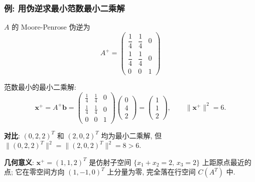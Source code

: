 \begin{frame}
\frametitle{例: 用伪逆求最小范数最小二乘解}

$A$ 的 Moore-Penrose 伪逆为
\[A^+ = \begin{pmatrix}\dfrac{1}{4} & \dfrac{1}{4} & 0 \\[6pt] \dfrac{1}{4} & \dfrac{1}{4} & 0 \\[2pt] 0 & 0 & 1\end{pmatrix}\]

\pause
\vspace{0.3em}

范数最小的最小二乘解:
\[\mathbf{x}^+ = A^+\mathbf{b} = \begin{pmatrix}\frac{1}{4}&\frac{1}{4}&0\\\frac{1}{4}&\frac{1}{4}&0\\0&0&1\end{pmatrix}\begin{pmatrix}0\\4\\2\end{pmatrix} = \begin{pmatrix}1\\1\\2\end{pmatrix}, \qquad \lVert\mathbf{x}^+\rVert^2 = 6.\]

\pause
\vspace{0.3em}

\textbf{对比}: $(0,2,2)^T$ 和 $(2,0,2)^T$ 均为最小二乘解, 但 $\lVert(0,2,2)^T\rVert^2 = \lVert(2,0,2)^T\rVert^2 = 8 > 6$.

\vspace{0.3em}
\textbf{几何意义}: $\mathbf{x}^+ = (1,1,2)^T$ 是仿射子空间 $\{x_1+x_2=2,\, x_3=2\}$ 上距原点最近的点; 它在零空间方向 $(1,-1,0)^T$ 上分量为零, 完全落在行空间 $C(A^T)$ 中.

\end{frame}



